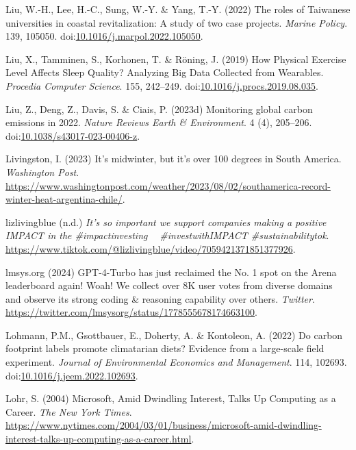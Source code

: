 \documentclass[
  letterpaper,
  DIV=11,
  numbers=noendperiod]{scrartcl}
\newlength{\cslhangindent}
\newenvironment{CSLReferences}[2] %
 {\begin{list}{}{%
  \setlength{\itemindent}{0pt}
  \setlength{\leftmargin}{0pt}
  \setlength{\parsep}{0pt}
  \ifodd #1
   \setlength{\leftmargin}{\cslhangindent}
   \setlength{\itemindent}{-1\cslhangindent}
  \fi
  \setlength{\itemsep}{#2\baselineskip}}}
 {\end{list}}
\begin{document}
\begin{CSLReferences}{0}{1}
Liu, W.-H., Lee, H.-C., Sung, W.-Y. \& Yang, T.-Y. (2022) The roles of
{Taiwanese} universities in coastal revitalization: {A} study of two
case projects. \emph{Marine Policy}. 139, 105050.
doi:\href{https://doi.org/10.1016/j.marpol.2022.105050}{10.1016/j.marpol.2022.105050}.

Liu, X., Tamminen, S., Korhonen, T. \& Röning, J. (2019) How {Physical
Exercise Level Affects Sleep Quality}? {Analyzing Big Data Collected}
from {Wearables}. \emph{Procedia Computer Science}. 155, 242--249.
doi:\href{https://doi.org/10.1016/j.procs.2019.08.035}{10.1016/j.procs.2019.08.035}.

Liu, Z., Deng, Z., Davis, S. \& Ciais, P. (2023d) Monitoring global
carbon emissions in 2022. \emph{Nature Reviews Earth \& Environment}. 4
(4), 205--206.
doi:\href{https://doi.org/10.1038/s43017-023-00406-z}{10.1038/s43017-023-00406-z}.

Livingston, I. (2023) It's midwinter, but it's over 100 degrees in
{South America}. \emph{Washington Post}.
\url{https://www.washingtonpost.com/weather/2023/08/02/southamerica-record-winter-heat-argentina-chile/}.

lizlivingblue (n.d.) \emph{It's so important we support companies making
a positive {IMPACT} in the \#impactinvesting 💚💸 \#{investwithIMPACT}
\#sustainabilitytok}.
\url{https://www.tiktok.com/@lizlivingblue/video/7059421371851377926}.

lmsys.org (2024) {GPT-4-Turbo} has just reclaimed the {No}. 1 spot on
the {Arena} leaderboard again! {Woah}! {We} collect over {8K} user votes
from diverse domains and observe its strong coding \& reasoning
capability over others. \emph{Twitter}.
\url{https://twitter.com/lmsysorg/status/1778555678174663100}.

Lohmann, P.M., Gsottbauer, E., Doherty, A. \& Kontoleon, A. (2022) Do
carbon footprint labels promote climatarian diets? {Evidence} from a
large-scale field experiment. \emph{Journal of Environmental Economics
and Management}. 114, 102693.
doi:\href{https://doi.org/10.1016/j.jeem.2022.102693}{10.1016/j.jeem.2022.102693}.

Lohr, S. (2004) Microsoft, {Amid Dwindling Interest}, {Talks Up
Computing} as a {Career}. \emph{The New York Times}.
\url{https://www.nytimes.com/2004/03/01/business/microsoft-amid-dwindling-interest-talks-up-computing-as-a-career.html}.


\end{CSLReferences}
\end{document}
